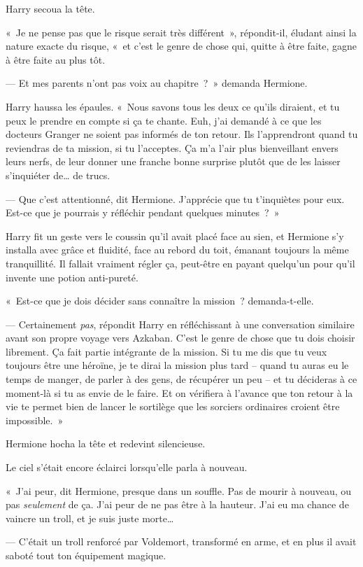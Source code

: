 Harry secoua la tête.

«~Je ne pense pas que le risque serait très différent~», répondit-il, éludant ainsi la nature exacte du risque, «~et c'est le genre de chose qui, quitte à être faite, gagne à être faite au plus tôt.

--- Et mes parents n'ont pas voix au chapitre~?~»
demanda Hermione.

Harry haussa les épaules.
«~Nous savons tous les deux ce qu'ils diraient, et tu peux le prendre en compte si ça te chante.
Euh, j'ai demandé à ce que les docteurs Granger ne soient pas informés de ton retour.
Ils l'apprendront quand tu reviendras de ta mission, si tu l'acceptes.
Ça m'a l'air plus bienveillant envers leurs nerfs, de leur donner une franche bonne surprise plutôt que de les laisser s'inquiéter de… de trucs.

--- Que c'est attentionné, dit Hermione.
J'apprécie que tu t'inquiètes pour eux.
Est-ce que je pourrais y réfléchir pendant quelques minutes~?~»

Harry fit un geste vers le coussin qu'il avait placé face au sien, et Hermione s'y installa avec grâce et fluidité, face au rebord du toit, émanant toujours la même tranquillité.
Il fallait vraiment régler ça, peut-être en payant quelqu'un pour qu'il invente une potion anti-pureté.

«~Est-ce que je dois décider sans connaître la mission~? demanda-t-elle.

--- Certainement \emph{pas}, répondit Harry en réfléchissant à une conversation similaire avant son propre voyage vers Azkaban.
C'est le genre de chose que tu dois choisir librement.
Ça fait partie intégrante de la mission.
Si tu me dis que tu veux toujours être une héroïne, je te dirai la mission plus tard -- quand tu auras eu le temps de manger, de parler à des gens, de récupérer un peu -- et tu décideras à ce moment-là si tu as envie de le faire.
Et on vérifiera à l'avance que ton retour à la vie te permet bien de lancer le sortilège que les sorciers ordinaires croient être impossible.~»

Hermione hocha la tête et redevint silencieuse.

Le ciel s'était encore éclairci lorsqu'elle parla à nouveau.

«~J'ai peur, dit Hermione, presque dans un souffle.
Pas de mourir à nouveau, ou pas \emph{seulement} de ça.
J'ai peur de ne pas être à la hauteur.
J'ai eu ma chance de vaincre un troll, et je suis juste morte…

--- C'était un troll renforcé par Voldemort, transformé en arme, et en plus il avait saboté tout ton équipement magique.

